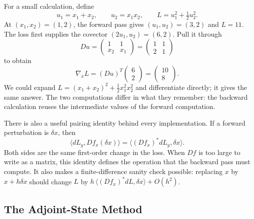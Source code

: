 For a small calculation, define
\[
 u_1=x_1+x_2,\qquad u_2=x_1x_2,\qquad
 L=u_1^2+\tfrac12u_2^2.
\]
At $(x_1,x_2)=(1,2)$, the forward pass gives $(u_1,u_2)=(3,2)$ and $L=11$. The loss first supplies the covector $(2u_1,u_2)=(6,2)$. Pull it through
\[
 Du=\begin{pmatrix}1&1\\x_2&x_1\end{pmatrix}
    =\begin{pmatrix}1&1\\2&1\end{pmatrix}
\]
to obtain
\[
 \boxed{\nabla_x L=(Du)^T
 \begin{pmatrix}6\\2\end{pmatrix}
 =\begin{pmatrix}10\\8\end{pmatrix}.}
\]
We could expand $L=(x_1+x_2)^2+\frac12x_1^2x_2^2$ and differentiate directly; it gives the same answer. The two computations differ in what they remember: the backward calculation reuses the intermediate values of the forward computation.

There is also a useful pairing identity behind every implementation. If a forward perturbation is $\delta x$, then
\[
 \big\langle dL_y,Df_x(\delta x)\big\rangle
   =\big\langle(Df_x)^*dL_y,\delta x\big\rangle.
\]
Both sides are the same first-order change in the loss. When $Df$ is too large to write as a matrix, this identity defines the operation that the backward pass must compute. It also makes a finite-difference sanity check possible: replacing $x$ by $x+h\delta x$ should change $L$ by
$h\,\langle(Df_x)^*dL,\delta x\rangle+O(h^2)$.

\subsection*{The Adjoint-State Method}

